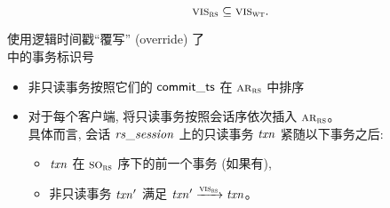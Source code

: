 \begin{frame}{}
  \begin{lemma}
	\[
	  \textsc{vis}_{\textsc{rs}} \subseteq \textsc{vis}_{\textsc{wt}}.
	\]
  \end{lemma}

  \vspace{0.50cm}
  \begin{center}
	\rsalg{} 使用逻辑时间戳``覆写'' (override) 了 \\[5pt]
	\wtalg{} 中的事务标识号
  \end{center}
\end{frame}

\begin{frame}{}
  \begin{definition}
	\begin{itemize}
	  \setlength{\itemsep}{10pt}
	  \item 非只读事务按照它们的 ${\sf commit\_ts}$ 在 $\textsc{ar}_{\textsc{rs}}$ 中排序
	  \item 对于每个客户端, 将只读事务按照会话序依次插入 $\textsc{ar}_{\textsc{rs}}$。\\[5pt]
	    具体而言, 会话 $\mathit{rs\_session}$ 上的只读事务 $\mathit{txn}$ 紧随以下事务之后: \\[5pt]
	    \begin{itemize}
		  \setlength{\itemsep}{5pt}
		  \item $\mathit{txn}$ 在 $\textsc{so}_{\textsc{rs}}$ 序下的前一个事务 (如果有),
		  \item 非只读事务 $\mathit{txn}'$ 满足 $\mathit{txn}' \xrightarrow{\textsc{vis}_{\textsc{rs}}} \mathit{txn}$。
		\end{itemize}
	\end{itemize}
  \end{definition}
\end{frame}
